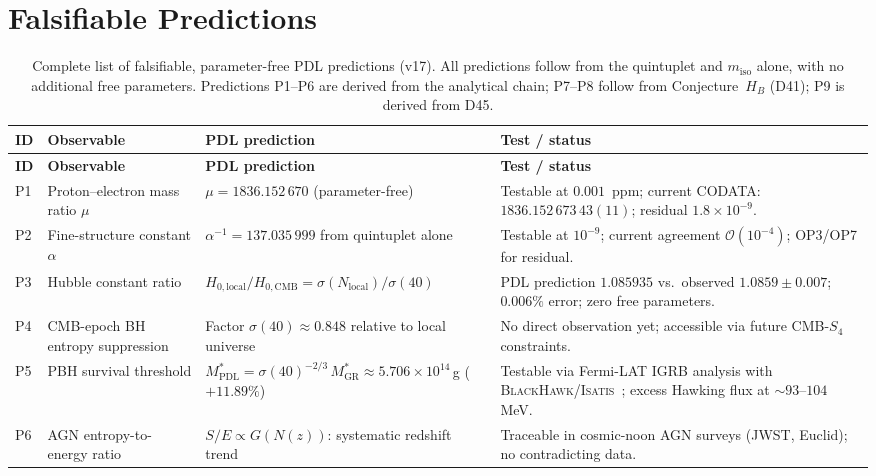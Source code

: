 \documentclass[11pt,a4paper]{article}
\theoremstyle{plain}
\theoremstyle{definition}
\theoremstyle{remark}
\begin{document}
\newpage

\section{Falsifiable Predictions}
\label{sec:predictions}

\begin{longtable}{L{0.5cm}L{3.2cm}L{5.2cm}L{4.2cm}}
\caption{Complete list of falsifiable, parameter-free PDL predictions (v17). All predictions follow from the quintuplet and $m_{\mathrm{iso}}$ alone, with no additional free parameters. Predictions P1--P6 are derived from the analytical chain; P7--P8 follow from Conjecture~$H_B$ (D41); P9 is derived from D45.}
\label{tab:predictions}\\
\toprule
\textbf{ID} & \textbf{Observable} & \textbf{PDL prediction} & \textbf{Test / status}\\
\midrule
\endfirsthead
\toprule
\textbf{ID} & \textbf{Observable} & \textbf{PDL prediction} & \textbf{Test / status}\\
\midrule
\endhead
\bottomrule
\endfoot
P1 & Proton--electron mass ratio $\mu$ & $\mu=1836.152\,670$ (parameter-free) & Testable at $0.001$~ppm; current CODATA: $1836.152\,673\,43(11)$; residual $1.8\times10^{-9}$.\\[0.4em]
P2 & Fine-structure constant $\alpha$ & $\alpha^{-1}=137.035\,999$ from quintuplet alone & Testable at $10^{-9}$; current agreement $\mathcal{O}(10^{-4})$; OP3/OP7 for residual.\\[0.4em]
P3 & Hubble constant ratio & $H_{0,\mathrm{local}}/H_{0,\mathrm{CMB}}=\sigma(N_{\mathrm{local}})/\sigma(40)$ & PDL prediction $1.085935$ vs.\ observed $1.0859\pm0.007$; $0.006\%$ error; zero free parameters.\\[0.4em]
P4 & CMB-epoch BH entropy suppression & Factor $\sigma(40)\approx 0.848$ relative to local universe & No direct observation yet; accessible via future CMB-$S_4$ constraints.\\[0.4em]
P5 & PBH survival threshold & $M^*_{\mathrm{PDL}}=\sigma(40)^{-2/3}\,M^*_{\mathrm{GR}}\approx 5.706\times10^{14}$\,g ($+11.89\%$) & Testable via Fermi-LAT IGRB analysis with \textsc{BlackHawk}/\textsc{Isatis}~\cite{D45}; excess Hawking flux at $\sim93$--$104$\,MeV.\\[0.4em]
P6 & AGN entropy-to-energy ratio & $S/E\propto G(N(z))$: systematic redshift trend & Traceable in cosmic-noon AGN surveys (JWST, Euclid); no contradicting data.\\[0.4em]

\end{longtable}
\end{document}
